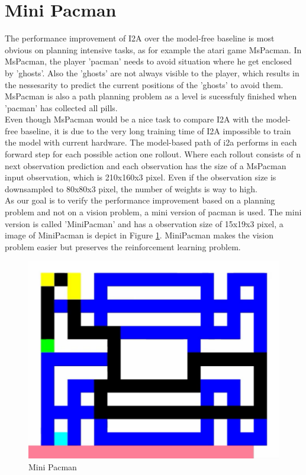 \section{Mini Pacman}

The performance improvement of I2A over the model-free baseline is most obvious on planning intensive tasks, as for example the atari game MsPacman.
In MsPacman, the player 'pacman' needs to avoid situation where he get enclosed by 'ghosts'. Also the 'ghosts' are not always visible to the player, which results in the nessesarity to predict the current positions of the 'ghosts' to avoid them.
MsPacman is also a path planning problem as a level is sucessfuly finished when 'pacman' has collected all pills.\\

Even though MsPacman would be a nice task to compare I2A with the model-free baseline, it is due to the very long training time of I2A  impossible to train the model with current hardware.
The model-based path of i2a performs in each forward step for each possible action one rollout. Where each rollout consists of n next observation prediction and each observation has the size of a MsPacman input observation, which is 210x160x3 pixel. Even if the observation size is downsampled to 80x80x3 pixel, the number of weights is way to high.\\

As our goal is to verify the performance improvement based on a planning problem and not on a vision problem, a mini version of pacman is used. The mini version is called 'MiniPacman' and has a observation size of 15x19x3 pixel, a image of MiniPacman is depict in Figure \ref{fig:mini_pacman}.
MiniPacman makes the vision problem easier but preserves the reinforcement learning problem.


\begin{figure}[H] 
  \centering   
  \includegraphics[width=0.5\columnwidth]{./Images/mini_pacman.png}
  \caption{Mini Pacman} 
  \label{fig:mini_pacman} 
\end{figure} 


